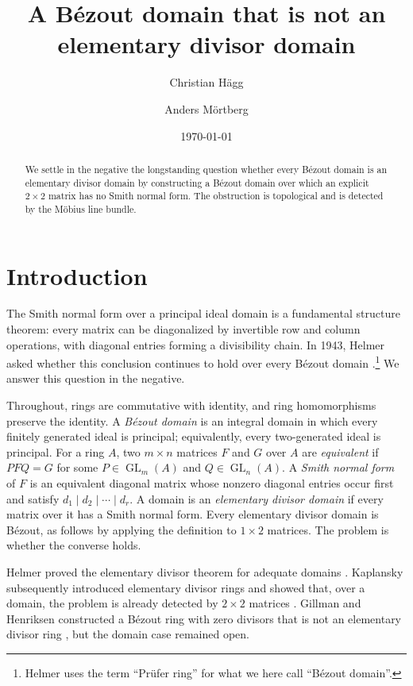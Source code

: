 \documentclass[11pt]{amsart}
\title{A B\'ezout domain that is not an elementary divisor domain}
\author[Christian H\"agg]{Christian H\"agg}
\author[Anders M\"ortberg]{Anders M\"ortberg}
\date{\today}
\numberwithin{equation}{section}
\theoremstyle{definition}
\DeclareMathOperator{\GL}{GL}
\begin{document}
\begin{abstract}
We settle in the negative the longstanding question whether every B\'ezout domain is an elementary divisor domain by constructing a B\'ezout domain over which an explicit $2\times2$ matrix has no Smith normal form. The obstruction is topological and is detected by the M\"obius line bundle.
\end{abstract}

\maketitle

\section{Introduction}

The Smith normal form over a principal ideal domain is a fundamental structure theorem: every matrix can be diagonalized by invertible row and column operations, with diagonal entries forming a divisibility chain. In 1943, Helmer asked whether this conclusion continues to hold over every B\'ezout domain \cite{Helmer}.\footnote{Helmer uses the term ``Prüfer ring'' for what we here call ``B\'ezout domain''.}  We answer this question in the negative.

Throughout, rings are commutative with identity, and ring homomorphisms preserve the identity. A \emph{B\'ezout domain} is an integral domain in which every finitely generated ideal is principal; equivalently, every two-generated ideal is principal. For a ring $A$, two $m\times n$ matrices $F$ and $G$ over $A$ are \emph{equivalent} if $PFQ=G$ for some $P\in\GL_m(A)$ and $Q\in\GL_n(A)$. A \emph{Smith normal form} of $F$ is an equivalent diagonal matrix whose nonzero diagonal entries occur first and satisfy $d_1\mid d_2\mid\cdots\mid d_r$. A domain is an \emph{elementary divisor domain} if every matrix over it has a Smith normal form. Every elementary divisor domain is B\'ezout, as follows by applying the definition to $1\times2$ matrices. The problem is whether the converse holds.

Helmer proved the elementary divisor theorem for adequate domains \cite[Theorem~3]{Helmer}. Kaplansky subsequently introduced elementary divisor rings and showed that, over a domain, the problem is already detected by $2\times2$ matrices \cite[Theorem~5.1 and the subsequent remark]{Kaplansky}. Gillman and Henriksen constructed a B\'ezout ring with zero divisors that is not an elementary divisor ring \cite[Example~4.11]{GH}, but the domain case remained open.
\end{document}
